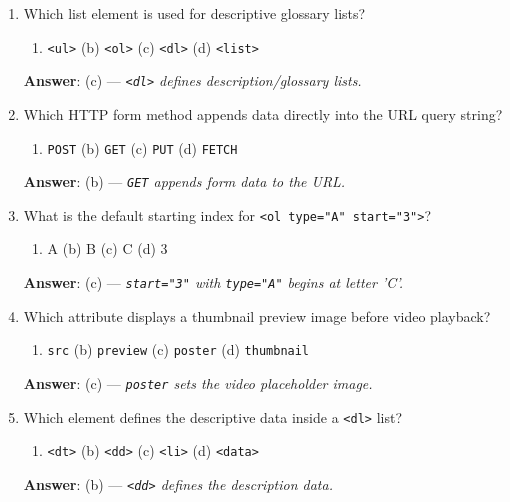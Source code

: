 \begin{enumerate}[leftmargin=1.5em]
    \item Which list element is used for descriptive glossary lists?
    \begin{enumerate}[label=(\alph*)]
        \item \texttt{<ul>} \quad (b) \texttt{<ol>} \quad (c) \texttt{<dl>} \quad (d) \texttt{<list>}
    \end{enumerate}
    \textbf{Answer}: (c) --- \textit{\texttt{<dl>} defines description/glossary lists.}

    \item Which HTTP form method appends data directly into the URL query string?
    \begin{enumerate}[label=(\alph*)]
        \item \texttt{POST} \quad (b) \texttt{GET} \quad (c) \texttt{PUT} \quad (d) \texttt{FETCH}
    \end{enumerate}
    \textbf{Answer}: (b) --- \textit{\texttt{GET} appends form data to the URL.}

    \item What is the default starting index for \texttt{<ol type="A" start="3">}?
    \begin{enumerate}[label=(\alph*)]
        \item A \quad (b) B \quad (c) C \quad (d) 3
    \end{enumerate}
    \textbf{Answer}: (c) --- \textit{\texttt{start="3"} with \texttt{type="A"} begins at letter 'C'.}

    \item Which attribute displays a thumbnail preview image before video playback?
    \begin{enumerate}[label=(\alph*)]
        \item \texttt{src} \quad (b) \texttt{preview} \quad (c) \texttt{poster} \quad (d) \texttt{thumbnail}
    \end{enumerate}
    \textbf{Answer}: (c) --- \textit{\texttt{poster} sets the video placeholder image.}

    \item Which element defines the descriptive data inside a \texttt{<dl>} list?
    \begin{enumerate}[label=(\alph*)]
        \item \texttt{<dt>} \quad (b) \texttt{<dd>} \quad (c) \texttt{<li>} \quad (d) \texttt{<data>}
    \end{enumerate}
    \textbf{Answer}: (b) --- \textit{\texttt{<dd>} defines the description data.}
\end{enumerate}

